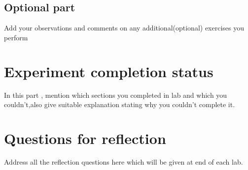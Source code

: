 \documentclass[12pt]{article}
\begin{document}
\subsection{Optional part }

Add your observations and comments on any additional(optional) exercises you perform


\section{Experiment completion status}
In this part , mention which sections you completed in lab and which you couldn't,also give suitable explanation stating why you couldn't complete it.

\section{Questions for reflection}
Address all the reflection questions here which will be given at end of each lab.
  
\end{document}
